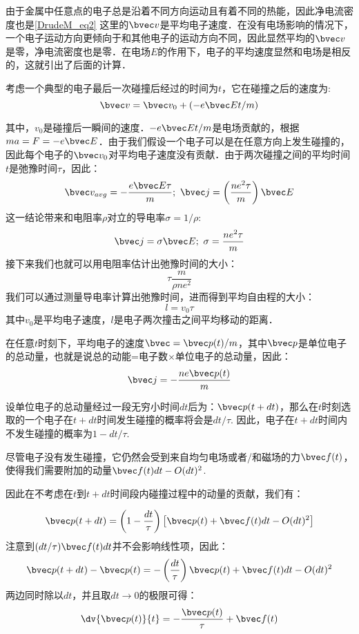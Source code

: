 由于金属中任意点的电子总是沿着不同方向运动且有着不同的热能，因此净电流密度也是\autoref{DrudeM_eq2} 这里的$\bvec v$是平均电子速度．在没有电场影响的情况下，一个电子运动方向更倾向于和其他电子的运动方向不同，因此显然平均的$\bvec v$是零，净电流密度也是零．在电场$E$的作用下，电子的平均速度显然和电场是相反的，这就引出了后面的计算．

考虑一个典型的电子最后一次碰撞后经过的时间为$t$，它在碰撞之后的速度为:
\begin{equation}
\bvec v = \bvec v_0 + (-e\bvec E t/m)
\end{equation}

其中，$v_0$是碰撞后一瞬间的速度．$-e\bvec E t/m$是电场贡献的，根据$ma = F = -e\bvec E$．由于我们假设一个电子可以是在任意方向上发生碰撞的，因此每个电子的$\bvec v_0$对平均电子速度没有贡献．由于两次碰撞之间的平均时间$t$是弛豫时间$\tau$，因此：
\begin{equation}
\bvec v_{avg} = -\frac{e\bvec E \tau}{m}; \ \bvec j =\left(\frac{ne^2\tau}{m}\right)\bvec E
\end{equation}
这一结论带来和电阻率$\rho$对立的导电率$\sigma = 1/\rho$:
\begin{equation}
\bvec j = \sigma \bvec E; \ \sigma = \frac{ne^2\tau}{m}
\end{equation}
接下来我们也就可以用电阻率估计出弛豫时间的大小：
\begin{equation}
\tau \frac{m}{\rho n e^2}
\end{equation}
我们可以通过测量导电率计算出弛豫时间，进而得到平均自由程的大小：
\begin{equation}
l=v_0\tau
\end{equation}
其中$v_0$是平均电子速度，$l$是电子两次撞击之间平均移动的距离．

在任意$t$时刻下，平均电子的速度$\bvec=\bvec p(t)/m$，其中$\bvec p$是单位电子的总动量，也就是说总的动能=电子数$\times$单位电子的总动量，因此：
\begin{equation}
\bvec j= -\frac{ne\bvec p(t)}{m}
\end{equation}

设单位电子的总动量经过一段无穷小时间$dt$后为：$\bvec p (t+dt)$，那么在$t$时刻选取的一个电子在$t+dt$时间发生碰撞的概率将会是$dt/\tau$. 因此，电子在$t+dt$时间内不发生碰撞的概率为$1-dt/\tau$.

尽管电子没有发生碰撞，它仍然会受到来自均匀电场或者/和磁场的力$\bvec f(t)$，使得我们需要附加的动量$\bvec f(t)dt - O(dt)^2$.

因此在不考虑在$t$到$t+dt$时间段内碰撞过程中的动量的贡献，我们有：

\begin{equation}
\bvec p(t+dt)=\left(1-\frac{dt}{\tau}\right)\left[\bvec p(t)+\bvec f(t)dt - O(dt)^2\right]
\end{equation}
注意到$(dt/\tau)\bvec f(t)dt$并不会影响线性项，因此：
\begin{equation}
\bvec p(t+dt)-\bvec p(t)=-\left(\frac{dt}{\tau}\right)\bvec p(t)+\bvec f(t)dt - O(dt)^2
\end{equation}
两边同时除以$dt$，并且取$dt\rightarrow 0$的极限可得：
\begin{equation}
\dv{\bvec p(t)}{t}= -\frac{\bvec p(t)}{\tau}+\bvec f(t)
\end{equation}

